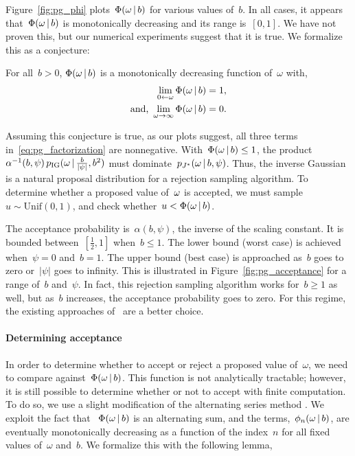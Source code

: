 Figure~\ref{fig:pg_phi} plots~$\Phi({\omega} \,|\, b)$ for various
values of~$b$.  In all cases, it appears that~$\Phi(\omega \,|\, b)$
is monotonically decreasing and its range is~$[0,1]$. We have not
proven this, but our numerical experiments suggest that it is true.
We formalize this as a conjecture:
\begin{conjecture}
  For all~$b>0$, $\Phi({\omega} \,|\, b)$ is a
  monotonically decreasing function of~$\omega$ with,
  \begin{align*}
    \lim_{0 \leftarrow \omega} \Phi(\omega \,|\, b) &= 1, \\
    \text{and, }
    \lim_{\omega \to \infty} \Phi(\omega \,|\, b) &= 0.
  \end{align*}
\end{conjecture}

Assuming this conjecture is true, as our plots suggest, all three
terms in~\eqref{eq:pg_factorization} are nonnegative.
With~${\Phi({\omega} \,|\, b) \leq 1}$, the
product~${\alpha^{-1}(b,\psi)\, p_{\mathrm{IG}}({\omega} \,|\,
  \tfrac{b}{|\psi|}, b^2)}$ must dominate~$p_{J^{*}}({\omega}
\,|\, b,\psi)$.  Thus, the inverse Gaussian is a natural proposal
distribution for a rejection sampling algorithm.  To determine whether
a proposed value of~${\omega}$ is accepted, we must sample~${u \sim
  \mathrm{Unif}(0,1)}$, and check whether~${u < \Phi({\omega} \,|\, b)}$.

The acceptance probability is~$\alpha(b,\psi)$, the inverse of the
scaling constant. It is bounded between~$[\tfrac{1}{2}, 1]$ when~${b
  \leq 1}$.  The lower bound (worst case) is achieved when~${\psi=0}$
and~${b=1}$.  The upper bound (best case) is approached as~$b$ goes to
zero or~$|\psi|$ goes to infinity.  This is illustrated in
Figure~\ref{fig:pg_acceptance} for a range of~$b$ and~$\psi$.
In fact, this rejection sampling algorithm works for~$b \geq 1$ as well,
but as~$b$ increases, the acceptance probability goes to zero. For
this regime, the existing approaches of~\citet{windle2014sampling} are
a better choice.

\paragraph{Determining acceptance}
In order to determine whether to accept or reject a proposed value
of~$\omega$, we need to compare against~${\Phi({\omega} \,|\, b)}$.
This function is not analytically tractable;
however, it is still possible to determine whether or not to accept
with finite computation. To do so, we use a slight modification of the
alternating series method \citep{devroye1986}.  We exploit the
fact that ~$\Phi({\omega} \,|\, b)$ is an alternating sum, and the
terms,~$\phi_n(\omega \,|\, b)$, are eventually monotonically decreasing as
a function of the index~$n$ for all fixed values of~$\omega$ and~$b$.
We formalize this with the following lemma,

